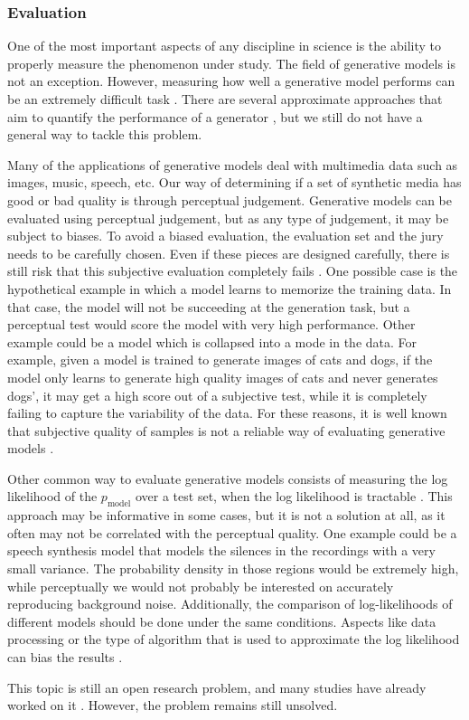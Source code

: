 \subsubsection{Evaluation} \label{sec:dgmevaluation}
One of the most important aspects of any discipline in science is the ability to properly measure the phenomenon under study. The field of generative models is not an exception. However, measuring how well a generative model performs can be an extremely difficult task \autocite{Goodfellow2016}. There are several approximate approaches that aim to quantify the performance of a generator \autocite{theis2016a}, but we still do not have a general way to tackle this problem.

Many of the applications of generative models deal with multimedia data such as images, music, speech, etc. Our way of determining if a set of synthetic media has good or bad quality is through perceptual judgement. Generative models can be evaluated using perceptual judgement, but as any type of judgement, it may be subject to biases. To avoid a biased evaluation, the evaluation set and the jury needs to be carefully chosen. Even if these pieces are designed carefully, there is still risk that this subjective evaluation completely fails \autocite{Goodfellow2016}. One possible case is the hypothetical example in which a model learns to memorize the training data. In that case, the model will not be succeeding at the generation task, but a perceptual test would score the model with very high performance. Other example could be a model which is collapsed into a mode in the data. For example, given a model is trained to generate images of cats and dogs, if the model only learns to generate high quality images of cats and never generates dogs', it may get a high score out of a subjective test, while it is completely failing to capture the variability of the data. For these reasons, it is well known that subjective quality of samples is not a reliable way of evaluating generative models \autocite{denton2015}.

Other common way to evaluate generative models consists of measuring the log likelihood of the $p_\mathrm{model}$ over a test set, when the log likelihood is tractable \autocite{Goodfellow2016}. This approach may be informative in some cases, but it is not a solution at all, as it often may not be correlated with the perceptual quality. One example could be a speech synthesis model that models the silences in the recordings with a very small variance. The probability density in those regions would be extremely high, while perceptually we would not probably be interested on accurately reproducing background noise. Additionally, the comparison of log-likelihoods of different models should be done under the same conditions. Aspects like data processing or the type of algorithm that is used to approximate the log likelihood can bias the results \autocite{Goodfellow2016}.

This topic is still an open research problem, and many studies have already worked on it \autocite{theis2016a, sajjadi2018}. However, the problem remains still unsolved.



